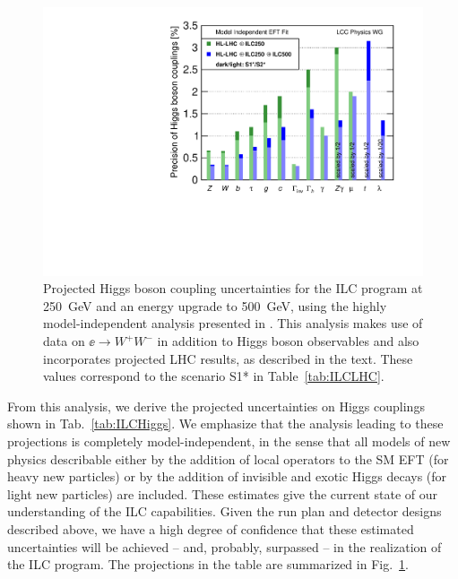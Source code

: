 \begin{figure}
\begin{center}
\includegraphics[width=0.7\hsize]{chapters/figures/DeltaHXX_SM_ILC_MI_S12s.pdf}
\caption{Projected Higgs boson coupling uncertainties for the ILC
  program at 250~GeV and an energy upgrade to 500~GeV, using the
  highly model-independent analysis presented in \cite{Fujii:2017vwa}. This
  analysis makes use of  data on $\ee\to W^+W^-$ in addition to Higgs
  boson observables and also incorporates projected LHC results, as described
  in the text.  These
values correspond to the  scenario S1* in Table~\ref{tab:ILCLHC}.}
\label{fig:ILCmodelindep}
\end{center}
\end{figure}
%
From this analysis, we derive the projected uncertainties on Higgs
couplings shown in Tab.~\ref{tab:ILCHiggs}.  We emphasize that the
analysis leading to these projections is completely model-independent,
in the sense that all models of new physics describable either by the
addition  of local operators to the SM EFT (for heavy new particles)
or by the addition of invisible and exotic Higgs decays (for light new
particles) are included.  These estimates give the
current state of our understanding of the ILC capabilities.  Given the
run plan and  detector designs described above, we have a high degree
of confidence that these estimated uncertainties will be achieved --
and, probably, surpassed -- in the realization of the ILC program.
The projections in the table are summarized in Fig.~\ref{fig:ILCmodelindep}.


